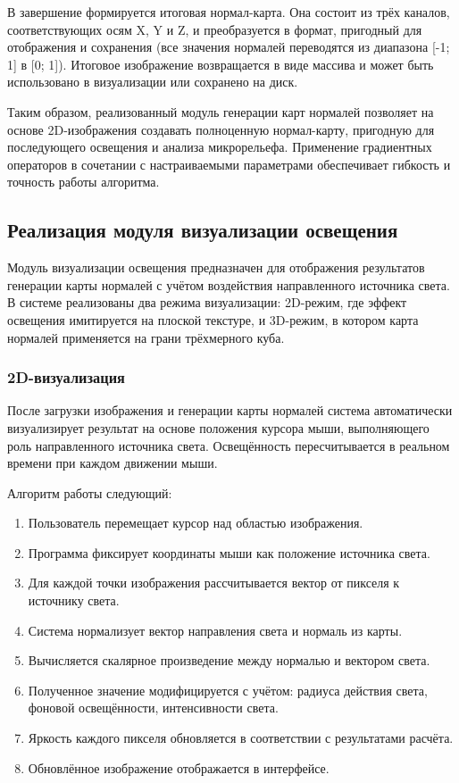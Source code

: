 В завершение формируется итоговая нормал-карта. Она состоит из трёх каналов, соответствующих осям X, Y и Z, и преобразуется в формат, пригодный для отображения и сохранения (все значения нормалей переводятся из диапазона [-1; 1] в [0; 1]). Итоговое изображение возвращается в виде массива и может быть использовано в визуализации или сохранено на диск.

Таким образом, реализованный модуль генерации карт нормалей позволяет на основе 2D-изображения создавать полноценную нормал-карту, пригодную для последующего освещения и анализа микрорельефа. Применение градиентных операторов в сочетании с настраиваемыми параметрами обеспечивает гибкость и точность работы алгоритма.
\subsection{Реализация модуля визуализации освещения}

Модуль визуализации освещения предназначен для отображения результатов генерации карты нормалей с учётом воздействия направленного источника света. В системе реализованы два режима визуализации: 2D-режим, где эффект освещения имитируется на плоской текстуре, и 3D-режим, в котором карта нормалей применяется на грани трёхмерного куба.
\subsubsection{2D-визуализация}

После загрузки изображения и генерации карты нормалей система автоматически визуализирует результат на основе положения курсора мыши, выполняющего роль направленного источника света. Освещённость пересчитывается в реальном времени при каждом движении мыши.

Алгоритм работы следующий:
\begin{enumerate}
	\item Пользователь перемещает курсор над областью изображения.
	\item Программа фиксирует координаты мыши как положение источника света.
	\item Для каждой точки изображения рассчитывается вектор от пикселя к источнику света.
	\item Система нормализует вектор направления света и нормаль из карты.
	\item Вычисляется скалярное произведение между нормалью и вектором света.
	\item Полученное значение модифицируется с учётом: радиуса действия света, фоновой освещённости, интенсивности света.
	\item Яркость каждого пикселя обновляется в соответствии с результатами расчёта.
	\item Обновлённое изображение отображается в интерфейсе.
\end{enumerate}

